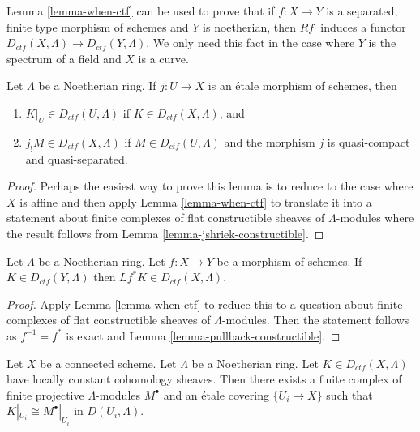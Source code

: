 \begin{remark}
\label{remark-how-used}
Lemma \ref{lemma-when-ctf}
can be used to prove that if $f : X \to Y$ is a separated, finite type
morphism of schemes and $Y$ is noetherian, then $Rf_!$ induces a functor
$D_{ctf}(X, \Lambda) \to D_{ctf}(Y, \Lambda)$. We only need this fact in
the case where $Y$ is the spectrum of a field and $X$ is a curve.
\end{remark}

\begin{lemma}
\label{lemma-restrict-and-shriek-from-etale-ctf}
Let $\Lambda$ be a Noetherian ring.
If $j : U \to X$ is an \'etale morphism of schemes, then
\begin{enumerate}
\item $K|_U \in D_{ctf}(U, \Lambda)$ if $K \in D_{ctf}(X, \Lambda)$, and
\item $j_!M \in D_{ctf}(X, \Lambda)$ if $M \in D_{ctf}(U, \Lambda)$ and
the morphism $j$ is quasi-compact and quasi-separated.
\end{enumerate}
\end{lemma}

\begin{proof}
Perhaps the easiest way to prove this lemma is to reduce to the
case where $X$ is affine and then apply Lemma \ref{lemma-when-ctf}
to translate it into a statement about finite complexes
of flat constructible sheaves of $\Lambda$-modules
where the result follows from
Lemma \ref{lemma-jshriek-constructible}.
\end{proof}

\begin{lemma}
\label{lemma-pullback-ctf}
Let $\Lambda$ be a Noetherian ring.
Let $f : X \to Y$ be a morphism of schemes. If $K \in D_{ctf}(Y, \Lambda)$
then $Lf^*K \in D_{ctf}(X, \Lambda)$.
\end{lemma}

\begin{proof}
Apply Lemma \ref{lemma-when-ctf} to reduce this to a question
about finite complexes of flat constructible sheaves of $\Lambda$-modules.
Then the statement follows as $f^{-1} = f^*$ is exact and
Lemma \ref{lemma-pullback-constructible}.
\end{proof}

\begin{lemma}
\label{lemma-connected-ctf-locally-constant}
Let $X$ be a connected scheme. Let $\Lambda$ be a Noetherian ring.
Let $K \in D_{ctf}(X, \Lambda)$ have locally constant cohomology sheaves.
Then there exists a finite complex of finite projective $\Lambda$-modules
$M^\bullet$ and an \'etale covering $\{U_i \to X\}$ such that
$K|_{U_i} \cong \underline{M^\bullet}|_{U_i}$ in $D(U_i, \Lambda)$.
\end{lemma}

